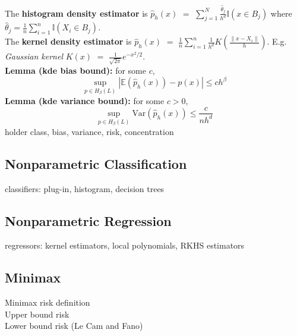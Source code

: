 \documentclass[10pt,twocolumn]{article}
\begin{document}
    The \textbf{histogram density estimator} is 
        $\hat{p}_h(x)$ $=$ $\sum_{j=1}^N \frac{\hat{\theta}_j}{h^d} \mathbb{I}(x \in B_j)$
        where $\hat{\theta}_j = \frac{1}{n} \sum_{i=1}^n \mathbb{I}(X_i \in B_j)$.\\
    The \textbf{kernel density estimator} is 
    $\hat{p}_h(x)$ $=$ $\frac{1}{n} \sum_{i=1}^n \frac{1}{h^d} K \left( \frac{\| x-X_i \|}{h}  \right).$
    E.g. \emph{Gaussian kernel} $K(x)$ $=$ $\frac{1}{\sqrt{2\pi}} e^{-x^2/2}$.\\
    \textbf{Lemma (kde bias bound):} for some $c$, 
    \begin{equation}
        \sup_{p \in H_{\beta}(L)} |\mathbb{E}\left(\hat{p}_h(x)\right) - p(x)| \leq ch^{\beta}
    \end{equation}
    \textbf{Lemma (kde variance bound):} for some $c>0$, 
    \begin{equation}
        \sup_{p \in H_{\beta}(L)} \text{Var}(\hat{p}_h(x)) \leq \frac{c}{nh^d}
    \end{equation}
    holder class, bias, variance, risk, concentration

\subsection*{Nonparametric Classification}
    classifiers: plug-in, histogram, decision trees

\subsection*{Nonparametric Regression}
    regressors: kernel estimators, local polynomials, RKHS estimators

\subsection*{Minimax}
    Minimax risk definition\\
    Upper bound risk\\
    Lower bound risk (Le Cam and Fano)
\end{document}
